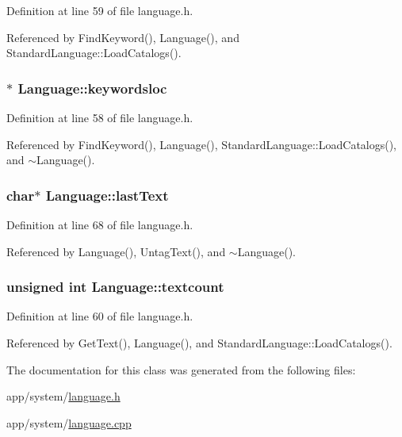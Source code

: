 Definition at line 59 of file language.\+h.



Referenced by Find\+Keyword(), Language(), and Standard\+Language\+::\+Load\+Catalogs().

\subsubsection[{\texorpdfstring{keywordsloc}{keywordsloc}}]{$\ast$ Language\+::keywordsloc\hspace{0.3cm}{\ttfamily [protected]}}\hypertarget{classLanguage_a14560ed53cf2860b61199d2882c52f67}{}\label{classLanguage_a14560ed53cf2860b61199d2882c52f67}


Definition at line 58 of file language.\+h.



Referenced by Find\+Keyword(), Language(), Standard\+Language\+::\+Load\+Catalogs(), and $\sim$\+Language().

\subsubsection[{\texorpdfstring{last\+Text}{lastText}}]{\setlength{\rightskip}{0pt plus 5cm}char$\ast$ Language\+::last\+Text\hspace{0.3cm}{\ttfamily [private]}}\hypertarget{classLanguage_ac4d2cf11e858e9d9a972b2cdf927f148}{}\label{classLanguage_ac4d2cf11e858e9d9a972b2cdf927f148}


Definition at line 68 of file language.\+h.



Referenced by Language(), Untag\+Text(), and $\sim$\+Language().

\subsubsection[{\texorpdfstring{textcount}{textcount}}]{\setlength{\rightskip}{0pt plus 5cm}unsigned int Language\+::textcount\hspace{0.3cm}{\ttfamily [protected]}}\hypertarget{classLanguage_ac648059e4bb481a66c5a075ab8684cb8}{}\label{classLanguage_ac648059e4bb481a66c5a075ab8684cb8}


Definition at line 60 of file language.\+h.



Referenced by Get\+Text(), Language(), and Standard\+Language\+::\+Load\+Catalogs().



The documentation for this class was generated from the following files\+:\begin{DoxyCompactItemize}
\item 
app/system/\hyperlink{language_8h}{language.\+h}\item 
app/system/\hyperlink{language_8cpp}{language.\+cpp}\end{DoxyCompactItemize}
